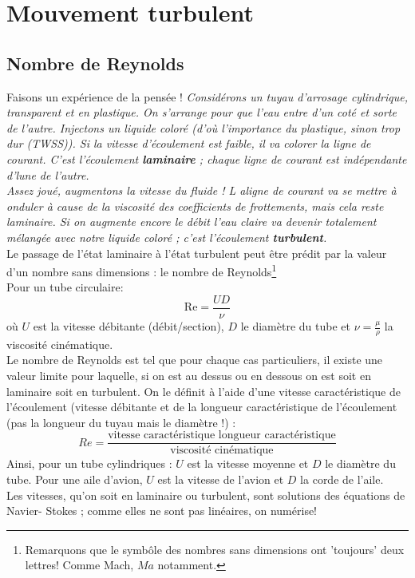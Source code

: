 \section{Mouvement turbulent}
	\subsection{Nombre de Reynolds}
	Faisons un expérience de la pensée ! \textit{Considérons un tuyau d'arrosage cylindrique,
	transparent et en plastique. On s'arrange pour que l'eau entre d'un coté et sorte de l'autre.
	Injectons un liquide coloré (d'où l'importance du plastique, sinon trop dur (TWSS)). Si la
	vitesse d'écoulement est faible, il va colorer la ligne de courant. C'est l'écoulement 
	\textbf{laminaire} ; chaque ligne de courant est indépendante d'lune de l'autre.}\\
	
	\textit{Assez joué, augmentons la vitesse du fluide ! L aligne de courant va se mettre à onduler à
	cause de la viscosité des coefficients de frottements, mais cela reste laminaire. Si on augmente
	encore le débit l'eau claire va devenir totalement mélangée avec notre liquide coloré ; c'est 
	l'écoulement \textbf{turbulent}.}\ \\
	
	Le passage de l'état laminaire à l'état turbulent peut être prédit par la valeur d'un
	nombre sans dimensions : le nombre de Reynolds\footnote{Remarquons que le symbôle des
	nombres sans dimensions ont 'toujours' deux lettres! Comme Mach, $Ma$ notamment.}\\
	Pour un tube circulaire:
	\begin{equation}
	\text{Re} = \frac{UD}{\nu}
	\end{equation}
	où $U$ est la vitesse débitante (débit/section), $D$ le diamètre du tube et $\nu = \frac{
	\mu}{\rho}$ la 	viscosité cinématique.\\
		
	
	Le nombre de Reynolds est tel que pour chaque cas particuliers, il existe une valeur limite pour 
	laquelle, si on est au dessus ou en dessous on est soit en laminaire soit en turbulent. On le 
	définit à l'aide d'une vitesse caractéristique de l’écoulement (vitesse débitante et de la longueur
	caractéristique de l’écoulement (pas la longueur du tuyau mais le diamètre !)	:
	\begin{equation}
	Re = \frac{\text{vitesse caractéristique\ \ \ \ \ longueur caractéristique}}{\text{viscosité 
	cinématique}}
	\end{equation}
	Ainsi, pour un tube cylindriques : $U$ est la vitesse moyenne et $D$ le diamètre du tube. Pour
	une aile d'avion, $U$ est la vitesse de l'avion et $D$ la corde de l'aile.\\
	Les vitesses, qu'on soit en laminaire ou turbulent, sont solutions des équations de Navier-
	Stokes ; comme elles ne sont pas linéaires, on numérise!
	
